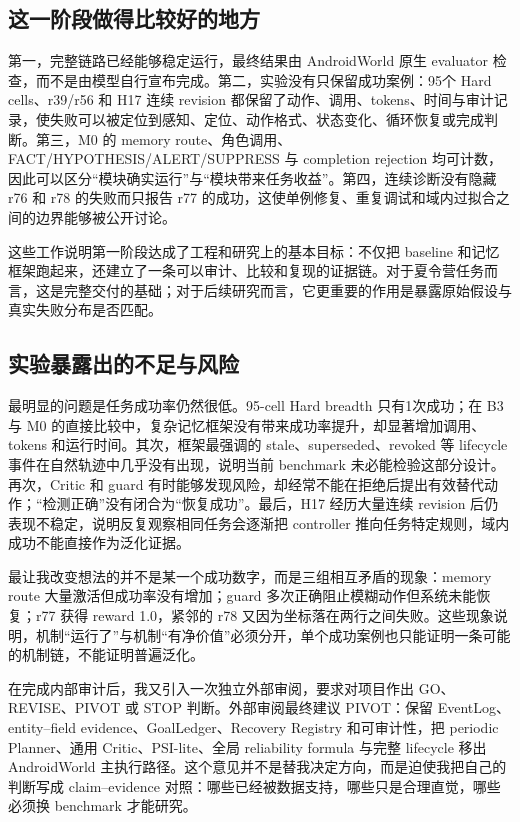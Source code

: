 \documentclass[12pt,a4paper]{ctexart}
\begin{document}
\subsection{这一阶段做得比较好的地方}

第一，完整链路已经能够稳定运行，最终结果由 AndroidWorld 原生 evaluator 检查，而不是由模型自行宣布完成。第二，实验没有只保留成功案例：95个 Hard cells、r39/r56 和 H17 连续 revision 都保留了动作、调用、tokens、时间与审计记录，使失败可以被定位到感知、定位、动作格式、状态变化、循环恢复或完成判断。第三，M0 的 memory route、角色调用、FACT/HYPOTHESIS/ALERT/SUPPRESS 与 completion rejection 均可计数，因此可以区分“模块确实运行”与“模块带来任务收益”。第四，连续诊断没有隐藏 r76 和 r78 的失败而只报告 r77 的成功，这使单例修复、重复调试和域内过拟合之间的边界能够被公开讨论。

这些工作说明第一阶段达成了工程和研究上的基本目标：不仅把 baseline 和记忆框架跑起来，还建立了一条可以审计、比较和复现的证据链。对于夏令营任务而言，这是完整交付的基础；对于后续研究而言，它更重要的作用是暴露原始假设与真实失败分布是否匹配。

\subsection{实验暴露出的不足与风险}

最明显的问题是任务成功率仍然很低。95-cell Hard breadth 只有1次成功；在 B3 与 M0 的直接比较中，复杂记忆框架没有带来成功率提升，却显著增加调用、tokens 和运行时间。其次，框架最强调的 stale、superseded、revoked 等 lifecycle 事件在自然轨迹中几乎没有出现，说明当前 benchmark 未必能检验这部分设计。再次，Critic 和 guard 有时能够发现风险，却经常不能在拒绝后提出有效替代动作；“检测正确”没有闭合为“恢复成功”。最后，H17 经历大量连续 revision 后仍表现不稳定，说明反复观察相同任务会逐渐把 controller 推向任务特定规则，域内成功不能直接作为泛化证据。

最让我改变想法的并不是某一个成功数字，而是三组相互矛盾的现象：memory route 大量激活但成功率没有增加；guard 多次正确阻止模糊动作但系统未能恢复；r77 获得 reward 1.0，紧邻的 r78 又因为坐标落在两行之间失败。这些现象说明，机制“运行了”与机制“有净价值”必须分开，单个成功案例也只能证明一条可能的机制链，不能证明普遍泛化。

在完成内部审计后，我又引入一次独立外部审阅，要求对项目作出 GO、REVISE、PIVOT 或 STOP 判断。外部审阅最终建议 PIVOT：保留 EventLog、entity--field evidence、GoalLedger、Recovery Registry 和可审计性，把 periodic Planner、通用 Critic、PSI-lite、全局 reliability formula 与完整 lifecycle 移出 AndroidWorld 主执行路径。这个意见并不是替我决定方向，而是迫使我把自己的判断写成 claim--evidence 对照：哪些已经被数据支持，哪些只是合理直觉，哪些必须换 benchmark 才能研究。
\end{document}
